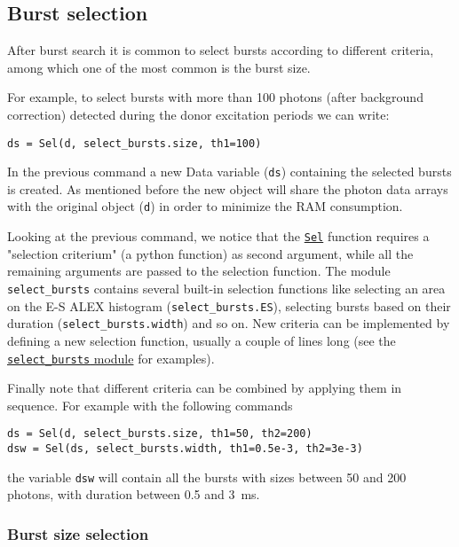 \subsection{Burst selection}
\label{sec:burstsel}

After burst search it is common to select bursts according to different criteria, among which one of the most common is the burst size.

For example, to select bursts with more than 100 photons (after background correction) detected during the donor excitation periods we can write:

\begin{verbatim}
ds = Sel(d, select_bursts.size, th1=100)
\end{verbatim}

In the previous command a new Data variable (\verb|ds|) containing the selected bursts is created. As mentioned before the new object will share the photon data arrays with the original object (\verb|d|) in order to minimize the RAM consumption.

Looking at the previous command, we notice that the \href{http://fretbursts.readthedocs.org/en/latest/burst_selection.html#fretbursts.burstlib.Sel}{\verb|Sel|} function requires a "selection criterium" (a python function) as second argument, while all the remaining arguments are passed to the selection function. The module \verb|select_bursts| contains several built-in selection functions like
selecting an area on the E-S ALEX histogram (\verb|select_bursts.ES|), 
selecting bursts based on their duration (\verb|select_bursts.width|) and so on. New criteria can be implemented by defining a new selection function, usually a couple of lines long (see the \href{https://github.com/tritemio/FRETBursts/blob/master/fretbursts/select_bursts.py}{\verb|select_bursts| module} for examples).

Finally note that different criteria can be combined by applying them
in sequence. For example with the following commands

\begin{verbatim}
ds = Sel(d, select_bursts.size, th1=50, th2=200)
dsw = Sel(ds, select_bursts.width, th1=0.5e-3, th2=3e-3)
\end{verbatim}

the variable \verb|dsw| will contain all the bursts with sizes between 50 and 200 photons, with duration between 0.5 and 3~ms.

\subsubsection{Burst size selection}

